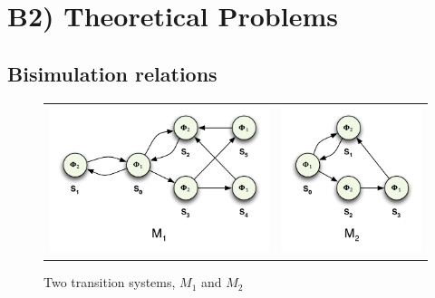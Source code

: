 \documentclass[12pt]{report}
\begin{document}
\section*{B2) Theoretical Problems}
\subsection*{Bisimulation relations}
\begin{figure}[H]
	\centering
	\begin{tabular}{ l r }
		\includegraphics[scale=0.75]{../GFX/ExerciseFigure2-M1.pdf}
		& \includegraphics[scale=0.75]{../GFX/ExerciseFigure2-M2.pdf}
	\end{tabular}
	\caption{Two transition systems, $M_1$ and $M_2$}
\end{figure}
\end{document}
